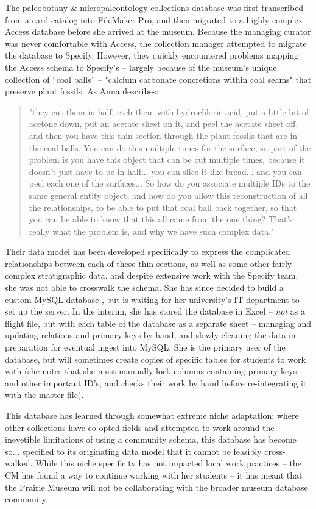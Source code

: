 The paleobotany & micropaleontology collections database was first transcribed from a card catalog into FileMaker Pro, and then migrated to a highly complex Access database before she arrived at the museum. Because the managing curator was never comfortable with Access, the collection manager attempted to migrate the database to Specify. However, they quickly encountered problems mapping the Access schema to Specify’s – largely because of the museum's unique collection of “coal balls” -- "calcium carbonate concretions within coal seams" that preserve plant fossils.  As Anna describes:
\begin{quote}
"they cut them in half, etch them with hydrochloric acid, put a little bit of acetone down, put an acetate sheet on it, and peel the acetate sheet off, and then you have this thin section through the plant fossils that are in the coal balls.  You can do this multiple times for the surface, so part of the problem is you have this object that can be cut multiple times, because it doesn't just have to be in half... you can slice it like bread... and you can peel each one of the surfaces...  So how do you associate multiple IDs to the same general entity object, and how do you allow this reconstruction of all the relationships, to be able to put that coal ball back together, so that you can be able to know that this all came from the one thing?  That's really what the problem is, and why we have such complex data."
\end{quote}
Their data model has been developed specifically to express the complicated relationships between each of these thin sections, as well as some other fairly complex stratigraphic data, and despite extensive work with the Specify team, she was not able to crosswalk the schema.  She has since decided to build a custom MySQL database , but is waiting for her university’s IT department to set up the server.  In the interim, she has stored the database in Excel -- \textit{not} as a flight file, but with each table of the database as a separate sheet -- managing and updating relations and primary keys by hand, and slowly cleaning the data in preparation for eventual ingest into MySQL. She is the primary user of the database, but will sometimes create copies of specific tables for students to work with (she notes that she must manually lock columns containing primary keys and other important ID’s, and checks their work by hand before re-integrating it with the master file).

This database has learned through somewhat extreme niche adaptation: where other collections have co-opted fields and attempted to work around the inevetible limitations of using a community schema, this database has become so... specified to its originating data model that it cannot be feasibly cross-walked. While this niche specificity has not impacted local work practices -- the CM has found a way to continue working with her students -- it has meant that the Prairie Museum will not be collaborating with the broader museum database community.

